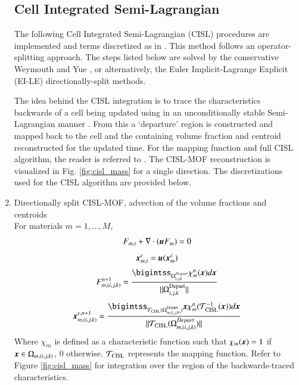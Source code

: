\documentclass[preprint,12pt]{Definitions/elsarticle}
\newcommand{\tn}{\textnormal}
\newcommand{\bmu}{\mbox{\boldmath $u$\unboldmath}}
\newcommand{\bmx}{\mbox{\boldmath $x$\unboldmath}}
\begin{document}
\begin{enumerate}
\newpage
	\subsection{Cell Integrated Semi-Lagrangian}\label{CISL}
	The following Cell Integrated Semi-Lagrangian (CISL) procedures are implemented and terms discretized as in \cite{pei2019hierarchical, LiETAL2015IncompressibleMultiphase,VAHAB2021}. This method follows an operator-splitting approach. The steps listed below are solved by the conservative  Weymouth and Yue \cite{WeymouthYue2010conservative}, or alternatively, the Euler Implicit-Lagrange Explicit (EI-LE) \cite{scardovelli2003interface,aulisa2007DirSplit} directionally-split methods. 
	
	The idea behind the CISL integration is to trace the characteristics backwards of a cell being updated using in an unconditionally stable Semi-Lagrangian manner \cite{STRAIN1999semiLagrangian, wang2012hybrid}. From this a `departure' region is constructed and mapped back to the cell and the containing volume fraction and centroid reconstructed for the updated time. For the mapping function and full CISL algorithm, the reader is referred to \cite{LiETAL2015IncompressibleMultiphase}. The CISL-MOF reconstruction is visualized in Fig. \ref{fig:cisl_mass} for a single direction. The discretizations used for the CISL algorithm are provided below.
	
	\item Directionally split CISL-MOF, advection of the volume fractions and centroids\\
	For materials $m=1, \ldots, M$,
	\begin{equation}
	F_{m,t}+\nabla\cdot(\bmu F_{m})=0
	\end{equation}
	\begin{equation}
	\bmx_{m,t}^c=\bmu(\bmx_{m}^c)
	\end{equation}
	\begin{equation}
	F_{m,(i,j,k)}^{n+1}=
	\frac{\bigintss_{\Omega_{i,j,k}^{Depart}} \chi_m^{n}(\bmx)d\bmx }
	{||\Omega_{i,j,k}^\tn{Depart}||} 		
	\end{equation}
	\begin{equation}
	\bmx_{m,(i,j,k)}^{c,n+1}=
	\frac{\bigintss_{\mathcal{T}_\tn{CISL}(\Omega_{m,(i,j,k)}^\tn{Depart})} 
		\bmx\chi_m^{n}(\mathcal{T}_\tn{CISL}^{-1}(\bmx)) d\bmx}
	{||\mathcal{T}_\tn{CISL}(\Omega_{m,(i,j,k)}^{Depart})||}
	\end{equation}
	Where $\displaystyle \chi_m$ is defined as a characteristic function such that $\chi_m(\bmx) = 1$ if $\bmx \in \Omega_{m,(i,j,k)}$, $0$ otherwise. $\mathcal{T}_\tn{CISL}$ represents the mapping function. Refer to Figure \ref{fig:cisl_mass} for integration over the region of the backwards-traced characteristics.
	

\end{enumerate}
\end{document}

